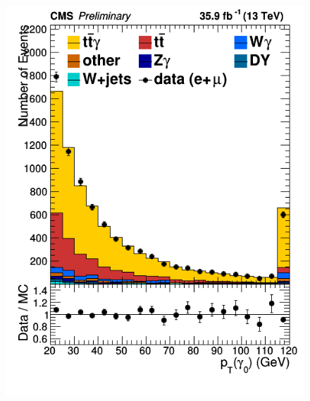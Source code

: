 \documentclass[11pt]{scrartcl}
\begin{document}
\begin{figure}[H]
\centering
\begin{minipage}{.5\textwidth}
  \centering
  \includegraphics[width=1\linewidth]{figures/PhotonGood0_pt_lin.png}
  \label{fig:PhotonPT}
\end{minipage}%
\begin{minipage}{.5\textwidth}
  \centering

\end{minipage}
\end{figure}
\end{document}
